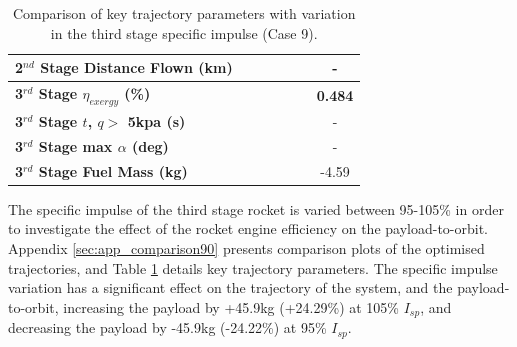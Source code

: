 \begin{table}[ht]
\begin{tabular}{l c c c c c c}
		\textbf{2$^{nd}$ Stage Distance Flown (km)}
		& \SecondDistTThreeNinetyNoReturn
		& \SecondDistTThreeNinetyFiveNoReturn
		& \SecondDistTThreeStandardNoReturn
		& \SecondDistTThreeOneHundredFiveNoReturn
		& \SecondDistTThreeOneHundredTenNoReturn
		& -
		\\
		\hline 
		\textbf{3$^{rd}$ Stage $\eta_{exergy}$ (\%)}
		& \textbf{\thirddExergyEffTThreeNinetyNoReturn}
		& \textbf{\thirddExergyEffTThreeNinetyFiveNoReturn}
		& \textbf{\thirddExergyEffTThreeStandardNoReturn}
		& \textbf{\thirddExergyEffTThreeOneHundredFiveNoReturn}
		& \textbf{\thirddExergyEffTThreeOneHundredTenNoReturn}
		& \textbf{0.484}
		\\
	
		\textbf{3$^{rd}$ Stage $t$, $q >$ 5kpa (s)}
		& \thirdqOverFiveTThreeNinetyNoReturn
		& \thirdqOverFiveTThreeNinetyFiveNoReturn
		& \thirdqOverFiveTThreeStandardNoReturn
		& \thirdqOverFiveTThreeOneHundredFiveNoReturn
		& \thirdqOverFiveTThreeOneHundredTenNoReturn
		& -
		\\
		\textbf{3$^{rd}$ Stage max $\alpha$ (deg)}
		& \thirdmaxAoATThreeNinetyNoReturn
		& \thirdmaxAoATThreeNinetyFiveNoReturn
		& \thirdmaxAoATThreeStandardNoReturn
		& \thirdmaxAoATThreeOneHundredFiveNoReturn
		& \thirdmaxAoATThreeOneHundredTenNoReturn
		& -
		\\
		\textbf{3$^{rd}$ Stage Fuel Mass (kg)}
		& \thirdmFuelTThreeNinetyNoReturn
		& \thirdmFuelTThreeNinetyFiveNoReturn
		& \thirdmFuelTThreeStandardNoReturn
		& \thirdmFuelTThreeOneHundredFiveNoReturn
		& \thirdmFuelTThreeOneHundredTenNoReturn
		&-4.59
		\\
		\hline 
	\end{tabular} 
	\caption{Comparison of key trajectory parameters with variation in the third stage specific impulse (Case 9).}
	\label{tab:comparison90}
\end{table}

The specific impulse of the third stage rocket is varied between 95-105\% in order to investigate the effect of the rocket engine efficiency on the payload-to-orbit. Appendix \ref{sec:app_comparison90} presents comparison plots of the optimised trajectories, and Table \ref{tab:comparison90} details key trajectory parameters. 
The specific impulse variation has a significant effect on the trajectory of the system, and the payload-to-orbit, increasing the payload by +45.9kg (+24.29\%) at 105\% $I_{sp}$, and decreasing the payload by -45.9kg (-24.22\%) at 95\% $I_{sp}$. 

